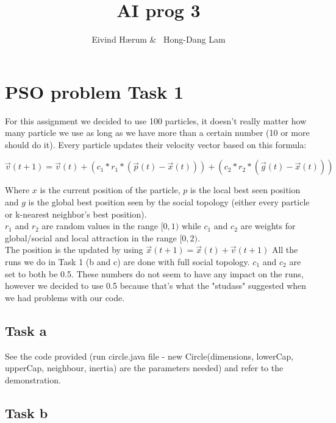 \documentclass[12pt, a4paper]{article}
\title{AI prog 3}
\author{Eivind Hærum \& \ Hong-Dang Lam}
\begin{document}
\maketitle
% 
% 
 
\newpage
\tableofcontents
\newpage
 
\section{PSO problem Task 1}
For this assignment we decided to use 100 particles, it doesn't really matter how many particle we use as long as we have more than a certain number (10 or more should do it).
Every particle updates their velocity vector based on this formula:
\begin{center}
$\vec{v}(t+1)=\vec{v}(t)+(c_1*r_1*(\vec{p}(t)-\vec{x}(t))) +(c_2*r_2*(\vec{g}(t)-\vec{x}(t)))$
\end{center}
Where $x$ is the current position of the particle, $p$ is the local best seen position and $g$ is the global best position seen by the social topology (either every particle or k-nearest neighbor's best position).\\
$r_1$ and $r_2$ are random values in the range $[0,1)$ while $c_1$ and $c_2$ are weights for global/social and local attraction in the range $[0,2)$.\\
The position is the updated by using $\vec{x}(t+1)=\vec{x}(t)+\vec{v}(t+1)$
All the runs we do in Task 1 (b and c) are done with full social topology.
$c_1$ and $c_2$ are set to both be 0.5. These numbers do not seem to have any impact on the runs, however we decided to use 0.5 because that's what the "studass" suggested when we had problems with our code.

\subsection{Task a}
See the code provided (run circle.java file - new Circle(dimensions, lowerCap, upperCap, neighbour, inertia) are the parameters needed) and refer to the demonstration.

\subsection{Task b}
\end{document}
